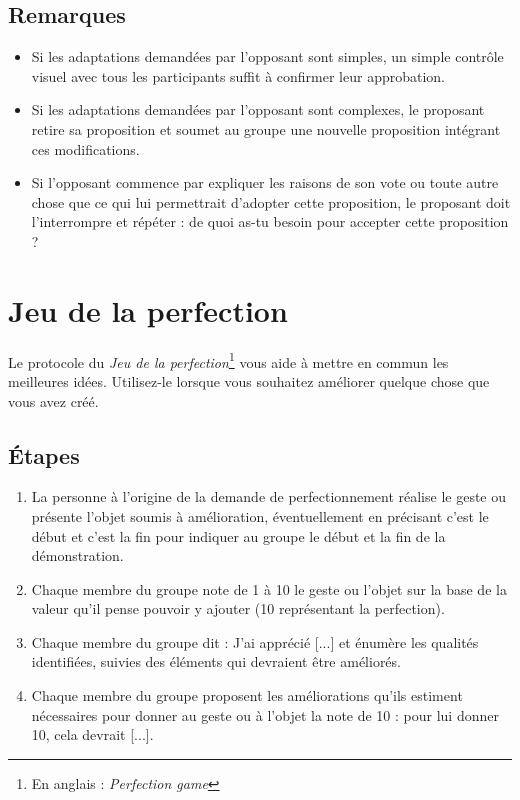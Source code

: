 \documentclass[paper=6in:9in,pagesize=pdftex,headinclude=on,footinclude=on,12pt]{scrbook}
\begin{document}
\subsection{Remarques}
\begin{itemize}
	\item Si les adaptations demandées par l'opposant sont simp\-les, un simple contrôle visuel avec tous les participants suffit à confirmer leur approbation.
	\item Si les adaptations demandées par l'opposant sont complexes, le proposant retire sa proposition et soumet au groupe une nouvelle proposition intégrant
	      ces modifications.
	\item Si l'opposant commence par expliquer les raisons de son vote ou toute autre chose que ce qui lui permettrait d'adopter cette proposition, le proposant
	      doit l'interrompre et répéter : \og{}de quoi as-tu besoin pour accepter cette proposition ?\fg{}
\end{itemize}

\section{Jeu de la perfection} \label{protocole-jeu-perfection}

Le protocole du \emph{Jeu de la perfection}\footnote{En anglais : \emph{Perfection game}} vous aide à mettre en commun les meilleures idées.
Utilisez-le lorsque vous souhaitez améliorer quelque chose que vous avez créé.

\subsection{Étapes}
\begin{enumerate}
	\item La personne à l'origine de la demande de perfectionnement réalise le geste ou présente l'objet soumis à amélioration, éventuellement en
	      précisant \og{}c'est le début\fg{} et \og{}c'est la fin\fg{} pour indiquer au groupe le début et la fin de la démonstration.
	\item Chaque membre du groupe note de 1 à 10 le geste ou l'objet sur la base de la valeur qu'il pense pouvoir y ajouter (10 représentant la perfection).
	\item Chaque membre du groupe dit : \og{}J'ai apprécié [...]\fg{} et énumère les qualités identifiées, suivies des éléments qui devraient être améliorés.
	\item Chaque membre du groupe proposent les améliorations qu'ils estiment nécessaires pour donner au geste ou à l'objet la note de 10 : \og{}pour lui donner
	      10, cela devrait [...]\fg{}.
\end{enumerate}
\end{document}
